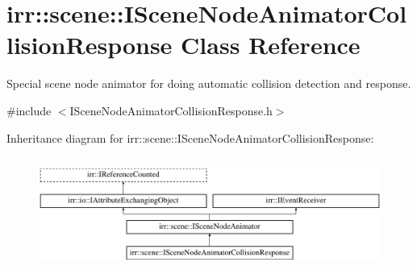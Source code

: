 \hypertarget{classirr_1_1scene_1_1ISceneNodeAnimatorCollisionResponse}{}\section{irr\+:\+:scene\+:\+:I\+Scene\+Node\+Animator\+Collision\+Response Class Reference}
\label{classirr_1_1scene_1_1ISceneNodeAnimatorCollisionResponse}


Special scene node animator for doing automatic collision detection and response.  




{\ttfamily \#include $<$I\+Scene\+Node\+Animator\+Collision\+Response.\+h$>$}

Inheritance diagram for irr\+:\+:scene\+:\+:I\+Scene\+Node\+Animator\+Collision\+Response\+:\begin{figure}[H]
\begin{center}
\leavevmode
\includegraphics[height=3.720930cm]{classirr_1_1scene_1_1ISceneNodeAnimatorCollisionResponse}
\end{center}
\end{figure}
